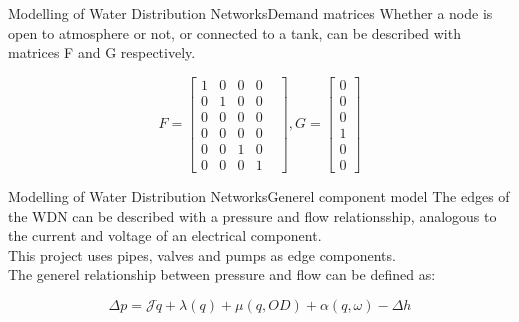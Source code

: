 \begin{frame}{Modelling of Water Distribution Networks}{Demand matrices}
Whether a node is open to atmosphere or not, or connected to a tank, can be described with matrices F and G respectively.
	
	
\begin{equation}
	F = \begin{bmatrix}
		1 & 0 & 0 & 0 \\
		0 & 1 & 0 & 0 \\
		0 & 0 & 0 & 0 \\
		0 & 0 & 0 & 0 \\
		0 & 0 & 1 & 0 & \\
		0 & 0 & 0 & 1 &
	\end{bmatrix}
	 , G = \begin{bmatrix}
		0  \\
		0  \\
		0  \\
		1  \\
		0 \\
		0 
\end{bmatrix}
\end{equation} 


	
\end{frame}



\begin{frame}{Modelling of Water Distribution Networks}{Generel component model}
	The edges of the WDN can be described with a pressure and flow relationsship, analogous to the current and voltage of an electrical component. \\
	\medskip
	This project uses pipes, valves and pumps as edge components. \\
	\medskip
	The generel relationship between pressure and flow can be defined as:
	
	\begin{equation}\label{eq:PressureFunction}
		\Delta p = \mathcal{J}\dot{q} + \lambda(q) + \mu(q, OD) + \alpha(q, \omega) -\Delta h
	\end{equation}
	
	
\end{frame}




